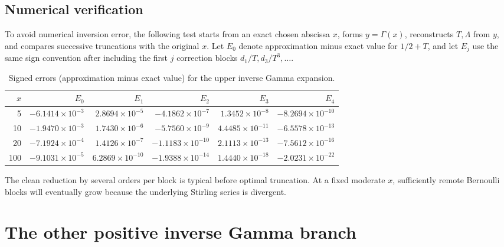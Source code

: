 \documentclass[11pt,oneside]{article}
\theoremstyle{plain}
\theoremstyle{definition}
\theoremstyle{remark}
\begin{document}
\subsection{Numerical verification}
\label{sec:gamma-numerics}

To avoid numerical inversion error, the following test starts from an exact
chosen abscissa \(x\), forms \(y=\Gamma(x)\), reconstructs \(T,\Lambda\) from
\(y\), and compares successive truncations with the original \(x\).  Let
\(E_0\) denote approximation minus exact value for \(1/2+T\), and let
\(E_j\) use the same sign convention after including the first \(j\)
correction blocks \(d_1/T,d_3/T^3,\ldots\).

\begin{table}[htbp]
\centering
\small
\caption{Signed errors (approximation minus exact value) for the upper inverse Gamma expansion.}
\label{tab:gamma-errors}
\begin{tabular}{r@{\quad}rrrrr}
\toprule
\(x\) & \(E_0\) & \(E_1\) & \(E_2\) & \(E_3\) & \(E_4\)\\
\midrule
5   & \(-6.1414\!\times10^{-3}\) & \( 2.8694\!\times10^{-5}\)
    & \(-4.1862\!\times10^{-7}\) & \( 1.3452\!\times10^{-8}\)
    & \(-8.2694\!\times10^{-10}\)\\
10  & \(-1.9470\!\times10^{-3}\) & \( 1.7430\!\times10^{-6}\)
    & \(-5.7560\!\times10^{-9}\) & \( 4.4485\!\times10^{-11}\)
    & \(-6.5578\!\times10^{-13}\)\\
20  & \(-7.1924\!\times10^{-4}\) & \( 1.4126\!\times10^{-7}\)
    & \(-1.1183\!\times10^{-10}\) & \( 2.1113\!\times10^{-13}\)
    & \(-7.5612\!\times10^{-16}\)\\
100 & \(-9.1031\!\times10^{-5}\) & \( 6.2869\!\times10^{-10}\)
    & \(-1.9388\!\times10^{-14}\) & \( 1.4440\!\times10^{-18}\)
    & \(-2.0231\!\times10^{-22}\)\\
\bottomrule
\end{tabular}
\end{table}

The clean reduction by several orders per block is typical before optimal
truncation.  At a fixed moderate \(x\), sufficiently remote Bernoulli blocks
will eventually grow because the underlying Stirling series is divergent.

\section{The other positive inverse Gamma branch}
\label{sec:gamma-small-branch}
\end{document}
